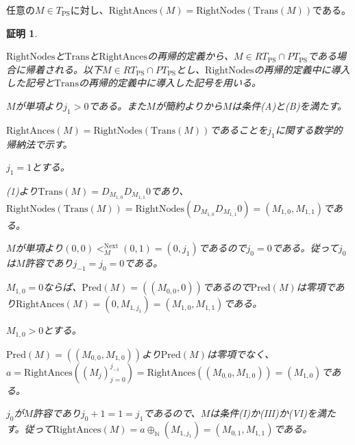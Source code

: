 \documentclass[dvipdfmx,uplatex]{jsarticle}
\theoremstyle{customnonumberbreakfortheorem}
\theoremstyle{customnonumberbreakforproof}
\newtheorem{hideableproof}{証明}
\begin{document}
\begin{proposition}\label{RightNodesとRightAncesの関係}
	任意の\(M \in T_{\textrm{PS}}\)に対し、\(\textrm{RightAnces}(M) = \textrm{RightNodes}(\textrm{Trans}(M))\)である。
\end{proposition}

\begin{hideableproof}
	\begin{indented}
		\item \(\textrm{RightNodes}\)と\(\textrm{Trans}\)と\(\textrm{RightAnces}\)の再帰的定義から、\(M \in RT_{\textrm{PS}} \cap PT_{\textrm{PS}}\)である場合に帰着される。以下\(M \in RT_{\textrm{PS}} \cap PT_{\textrm{PS}}\)とし、\(\textrm{RightNodes}\)の再帰的定義中に導入した記号と\(\textrm{Trans}\)の再帰的定義中に導入した記号を用いる。
		\item \(M\)が単項より\(j_1 > 0\)である。また\(M\)が簡約よりから\(M\)は条件(A)と(B)を満たす。
		\item \(\textrm{RightAnces}(M) = \textrm{RightNodes}(\textrm{Trans}(M))\)であることを\(j_1\)に関する数学的帰納法で示す。
		\item \(j_1 = 1\)とする。
		\begin{indented}
			\item {} (1)より\(\textrm{Trans}(M) = D_{M_{1,0}} D_{M_{1,1}} 0\)であり、\(\textrm{RightNodes}(\textrm{Trans}(M)) = \textrm{RightNodes}(D_{M_{1,0}} D_{M_{1,1}} 0) = (M_{1,0},M_{1,1})\)である。
			\item \(M\)が単項より\((0,0) <_M^{\textrm{Next}} (0,1) = (0,j_1)\)であるので\(j_0 = 0\)である。従って\(j_0\)は\(M\)許容であり\(j_{-1} = j_0 = 0\)である。
			\item \(M_{1,0} = 0\)ならば、\(\textrm{Pred}(M) = ((M_{0,0},0))\)であるので\(\textrm{Pred}(M)\)は零項であり\(\textrm{RightAnces}(M) = (0,M_{1,j_1}) = (M_{1,0},M_{1,1})\)である。
			\item \(M_{1,0} > 0\)とする。
			\begin{indented}
				\item \(\textrm{Pred}(M) = ((M_{0,0},M_{1,0}))\)より\(\textrm{Pred}(M)\)は零項でなく、\(a = \textrm{RightAnces}((M_j)_{j=0}^{j_{-1}}) = \textrm{RightAnces}((M_{0,0},M_{1,0})) = (M_{1,0})\)である。
				\item \(j_0\)が\(M\)許容であり\(j_0+1 = 1 = j_1\)であるので、\(M\)は条件(I)か(III)か(VI)を満たす。従って\(\textrm{RightAnces}(M) = a \oplus_{\mathbb{N}} (M_{1,j_1}) = (M_{0,1},M_{1,1})\)である。

\end{indented}
\end{indented}
\end{indented}
\end{hideableproof}
\end{document}
